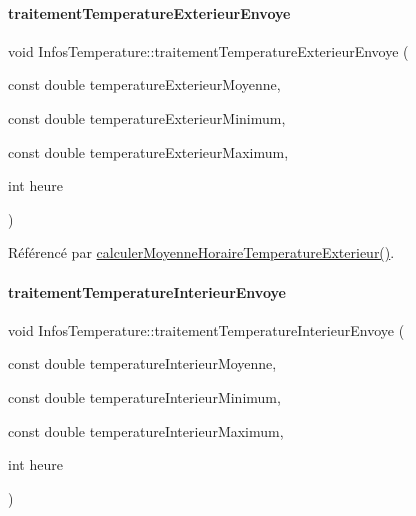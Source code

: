 \paragraph{\texorpdfstring{traitement\+Temperature\+Exterieur\+Envoye}{traitementTemperatureExterieurEnvoye}}
{\footnotesize\ttfamily void Infos\+Temperature\+::traitement\+Temperature\+Exterieur\+Envoye (\begin{DoxyParamCaption}\item[{const double}]{temperature\+Exterieur\+Moyenne,  }\item[{const double}]{temperature\+Exterieur\+Minimum,  }\item[{const double}]{temperature\+Exterieur\+Maximum,  }\item[{int}]{heure }\end{DoxyParamCaption})\hspace{0.3cm}{\ttfamily [signal]}}



Référencé par \hyperlink{class_infos_temperature_a437325028225d765780b884614c47077}{calculer\+Moyenne\+Horaire\+Temperature\+Exterieur()}.

\mbox{\label{class_infos_temperature_a2d7c580a215f918a79aac46a15ff24b9}} 
\paragraph{\texorpdfstring{traitement\+Temperature\+Interieur\+Envoye}{traitementTemperatureInterieurEnvoye}}
{\footnotesize\ttfamily void Infos\+Temperature\+::traitement\+Temperature\+Interieur\+Envoye (\begin{DoxyParamCaption}\item[{const double}]{temperature\+Interieur\+Moyenne,  }\item[{const double}]{temperature\+Interieur\+Minimum,  }\item[{const double}]{temperature\+Interieur\+Maximum,  }\item[{int}]{heure }\end{DoxyParamCaption})\hspace{0.3cm}{\ttfamily [signal]}}



